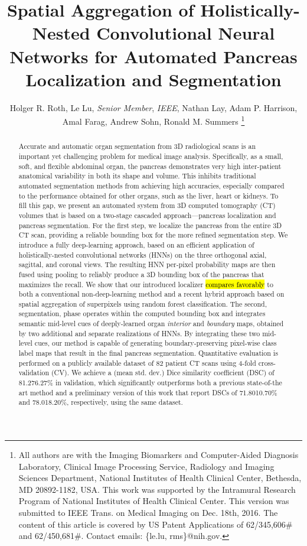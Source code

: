 \documentclass[journal]{IEEEtran}
\def \Npatients {82}
\begin{document}
\title{Spatial Aggregation of Holistically-Nested Convolutional Neural Networks for Automated Pancreas Localization and Segmentation} 
\author{Holger R. Roth, Le Lu, {\em Senior Member}, {\em IEEE}, Nathan Lay, Adam P. Harrison, Amal Farag, Andrew Sohn, Ronald M. Summers
\thanks{All authors are with the Imaging Biomarkers and Computer-Aided Diagnosis Laboratory, Clinical Image Processing Service, Radiology and Imaging Sciences Department, National Institutes of Health Clinical Center, Bethesda, MD 20892-1182, USA. This work was supported by the Intramural Research Program of National Institutes of Health Clinical Center. This version was submitted to IEEE Trans. on Medical Imaging on Dec. 18th, 2016. The content of this article is covered by US Patent Applications of 62/345,606\# and 62/450,681\#. Contact emails: \{le.lu, rms\}@nih.gov.
}} \maketitle
\begin{abstract}
Accurate and automatic organ segmentation from 3D radiological scans is an important yet challenging problem for medical image analysis. Specifically, as a small, soft, and flexible abdominal organ, the pancreas demonstrates very high inter-patient anatomical variability in both its shape and volume. This inhibits traditional automated segmentation methods from achieving high accuracies, especially compared to the performance obtained for other organs, such as the liver, heart or kidneys. 
To fill this gap, we present an automated system from 3D computed tomography (CT) volumes that is based on a two-stage cascaded approach---pancreas localization and pancreas segmentation. For the first step, we localize the pancreas from the entire 3D CT scan, providing a reliable bounding box for the more refined segmentation step. We introduce a fully deep-learning approach, based on an efficient application of holistically-nested convolutional networks (HNNs) on the three orthogonal axial, sagittal, and coronal views. The resulting HNN per-pixel probability maps are then fused using pooling to reliably produce a 3D bounding box of the pancreas that maximizes the recall. We show that our introduced localizer \hl{compares favorably} to both a conventional non-deep-learning method and a recent hybrid approach based on spatial aggregation of superpixels using random forest classification. The second, segmentation, phase operates within the computed bounding box and integrates semantic mid-level cues of deeply-learned organ {\em interior} and {\em boundary} maps, obtained by two additional and separate realizations of HNNs. By integrating these two mid-level cues, our method is capable of generating boundary-preserving pixel-wise class label maps that result in the final pancreas segmentation. 
Quantitative evaluation is performed on a publicly available dataset of \Npatients{} patient CT scans using 4-fold cross-validation (CV). We achieve a (mean  std. dev.) Dice similarity coefficient (DSC) of 81.276.27\% in validation, which significantly outperforms both a previous state-of-the art method and a preliminary version of this work that report DSCs of 71.8010.70\% and 78.018.20\%, respectively, using the same dataset.
\end{abstract}
\end{document}

